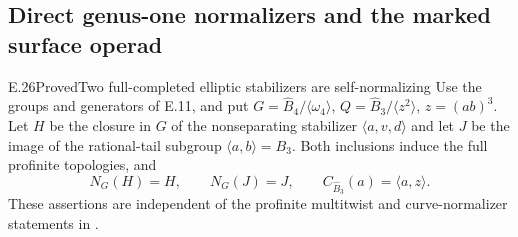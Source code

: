 \subsection{Direct genus-one normalizers and the marked surface operad}

\begin{result}{E.26}{Proved}{Two full-completed elliptic stabilizers are self-normalizing}
Use the groups and generators of E.11, and put
$G=\widehat B_4/\langle\omega _4\rangle$,
$Q=\widehat B_3/\langle z^2\rangle$,
$z=(ab)^3$.  Let $H$ be the closure in $G$ of the
nonseparating stabilizer $\langle a,v,d\rangle$ and
let $J$ be the image of the rational-tail subgroup
$\langle a,b\rangle=B_3$.  Both inclusions induce
the full profinite topologies, and
\[
 N_G(H)=H,\qquad N_G(J)=J,\qquad
 C_{\widehat B_3}(a)=\langle a,z\rangle.                 \tag{E.61}
\]
These assertions are independent of the profinite
multitwist and curve-normalizer statements in
\cite[\S5]{ET_Boggi2014}.
\end{result}
